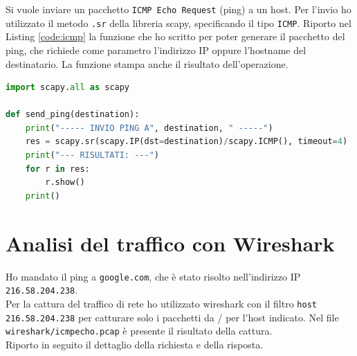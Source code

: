 \documentclass[12pt,a4paper]{report}
\begin{document}
Si vuole inviare un pacchetto \texttt{ICMP Echo Request} (ping) a un host. Per l'invio ho utilizzato il metodo \texttt{.sr} della libreria scapy, specificando il tipo \texttt{ICMP}. Riporto nel Listing \ref{code:icmp} la funzione che ho scritto per poter generare il pacchetto del ping, che richiede come parametro l'indirizzo IP oppure l'hostname del destinatario. La funzione stampa anche il risultato dell'operazione.

\begin{lstlisting}[language=Python, caption={Funzione python per la generazione di un pacchetto \texttt{ICMP Echo Request}}, label={code:icmp}]
import scapy.all as scapy

def send_ping(destination):
    print("----- INVIO PING A", destination, " -----")
    res = scapy.sr(scapy.IP(dst=destination)/scapy.ICMP(), timeout=4) 
    print("--- RISULTATI: ---")
    for r in res:
        r.show()
    print()
\end{lstlisting}

\section{Analisi del traffico con Wireshark}
Ho mandato il ping a \texttt{google.com}, che è stato risolto nell'indirizzo IP \texttt{216.58.204.238}.\\
Per la cattura del traffico di rete ho utilizzato wireshark con il filtro \texttt{host 216.58.204.238} per catturare solo i pacchetti da / per l'host indicato. Nel file \texttt{wireshark/icmp{\textunderscore}echo.pcap} è presente il risultato della cattura. \\
Riporto in seguito il dettaglio della richiesta e della risposta.
\end{document}
